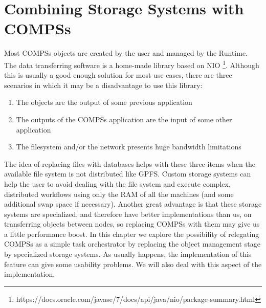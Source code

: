 \section{Combining Storage Systems with COMPSs}
\label{sec:storage}
Most COMPSs objects are created by the user and managed by the Runtime. The data transferring software is a home-made library based on NIO \footnote{https://docs.oracle.com/javase/7/docs/api/java/nio/package-summary.html}. Although this is usually a good enough solution for most use cases, there are three scenarios in which it may be a disadvantage to use this library:

\begin{enumerate}
\item The objects are the output of some previous application
\item The outputs of the COMPSs application are the input of some other application
\item The filesystem and/or the network presents huge bandwidth limitations
\end{enumerate}

The idea of replacing files with databases helps with these three items when the available file system is not distributed like GPFS. Custom storage systems can help the user to avoid dealing with the file system and execute complex, distributed workflows using only the RAM of all the machines (and some additional swap space if necessary). Another great advantage is that these storage systems are specialized, and therefore have better implementations than us, on transferring objects between nodes, so replacing COMPSs with them may give us a little performance boost. In this chapter we explore the possibility of relegating COMPSs as a simple task orchestrator by replacing the object management stage by specialized storage systems. As usually happens, the implementation of this feature can give some usability problems. We will also deal with this aspect of the implementation.


